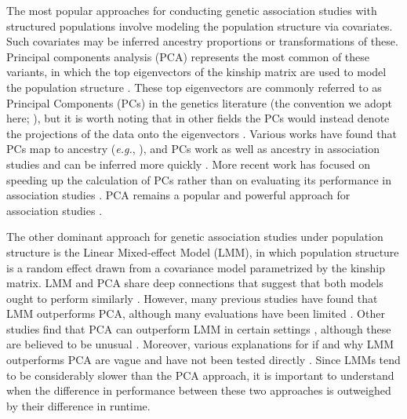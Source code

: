 \documentclass[11pt]{article}
\begin{document}
The most popular approaches for conducting genetic association studies with structured populations involve modeling the population structure via covariates.
Such covariates may be inferred ancestry proportions \citep{pritchard_association_2000} or transformations of these.
Principal components analysis (PCA) represents the most common of these variants, in which the top eigenvectors of the kinship matrix are used to model the population structure \citep{zhang_semiparametric_2003, price_principal_2006, bouaziz_accounting_2011}.
These top eigenvectors are commonly referred to as Principal Components (PCs) in the genetics literature (the convention we adopt here; \cite{patterson_population_2006}), but it is worth noting that in other fields the PCs would instead denote the projections of the data onto the eigenvectors \citep{jolliffe_principal_2002}.
Various works have found that PCs map to ancestry (\textit{e.g.}, \cite{zhou_strong_2016}), and PCs work as well as ancestry in association studies and can be inferred more quickly \citep{patterson_population_2006, zhao_arabidopsis_2007, bouaziz_accounting_2011}.
More recent work has focused on speeding up the calculation of PCs rather than on evaluating its performance in association studies \citep{lee_sparse_2012, abraham_fast_2014, galinsky_fast_2016, abraham_flashpca2:_2017}.
PCA remains a popular and powerful approach for association studies \citep{wojcik_genetic_2019}.

The other dominant approach for genetic association studies under population structure is the Linear Mixed-effect Model (LMM), in which population structure is a random effect drawn from a covariance model parametrized by the kinship matrix.
LMM and PCA share deep connections that suggest that both models ought to perform similarly \citep{astle_population_2009, janss_inferences_2012, hoffman_correcting_2013}.
However, many previous studies have found that LMM outperforms PCA, although many evaluations have been limited \citep{zhao_arabidopsis_2007, astle_population_2009, kang_variance_2010, song_testing_2015}.
Other studies find that PCA can outperform LMM in certain settings \citep{price_new_2010, wu_comparison_2011, wang_analytical_2013}, although these are believed to be unusual \citep{sul_mixed_2013}.
Moreover, various explanations for if and why LMM outperforms PCA are vague and have not been tested directly \citep{price_new_2010, sul_mixed_2013, price_response_2013, hoffman_correcting_2013}.
Since LMMs tend to be considerably slower than the PCA approach, it is important to understand when the difference in performance between these two approaches is outweighed by their difference in runtime.
\end{document}
